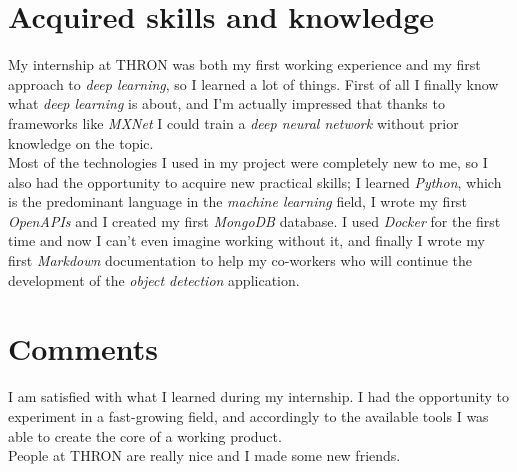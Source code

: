 \section{Acquired skills and knowledge}
My internship at THRON was both my first working experience and my first approach to \emph{deep learning}, so I learned a lot of things.
First of all I finally know what \emph{deep learning} is about, and I'm actually impressed that thanks to frameworks like \emph{MXNet} I could train a \emph{deep neural network} without prior knowledge on the topic. \\
Most of the technologies I used in my project were completely new to me, so I also had the opportunity to acquire new practical skills; I learned \emph{Python}, which is the predominant language in the \emph{machine learning} field, I wrote my first \emph{OpenAPIs} and I created my first \emph{MongoDB} database. I used \emph{Docker} for the first time and now I can't even imagine working without it, and finally I wrote my first \emph{Markdown} documentation to help my co-workers who will continue the development of the \emph{object detection} application.

\section{Comments}
I am satisfied with what I learned during my internship. I had the opportunity to experiment in a fast-growing field, and accordingly to the available tools I was able to create the core of a working product. \\
People at THRON are really nice and I made some new friends.
